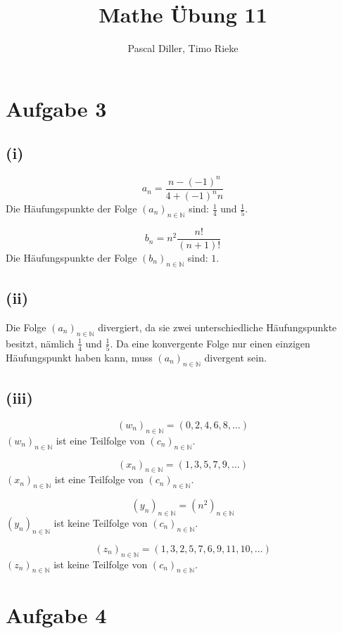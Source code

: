\documentclass{article}
\title{Mathe Übung 11}
\author{Pascal Diller, Timo Rieke}
\begin{document}
\maketitle
\section*{Aufgabe 3}

\subsection*{(i)}

    \[a_n = \frac{n - (-1)^n}{4 + (-1)^n n}\]
    Die Häufungspunkte der Folge \((a_n)_{n \in \mathbb{N}}\) sind: \(\frac{1}{4}\) und \(\frac{1}{5}\).

    \[b_n = n^2\frac{ n!}{(n+1)!}\]
    Die Häufungspunkte der Folge \((b_n)_{n \in \mathbb{N}}\) sind: \(1\).

\subsection*{(ii)}

Die Folge \((a_n)_{n \in \mathbb{N}}\) divergiert, da sie zwei unterschiedliche Häufungspunkte besitzt, nämlich \(\frac{1}{4}\) und \(\frac{1}{5}\). Da eine konvergente Folge nur einen einzigen Häufungspunkt haben kann, muss \((a_n)_{n \in \mathbb{N}}\) divergent sein.

\subsection*{(iii)}


    \[(w_n)_{n \in \mathbb{N}} = (0, 2, 4, 6, 8, \dots)\]  
    \((w_n)_{n \in \mathbb{N}}\) ist eine Teilfolge von \((c_n)_{n \in \mathbb{N}}\).

    \[(x_n)_{n \in \mathbb{N}} = (1, 3, 5, 7, 9, \dots)\]  
    \((x_n)_{n \in \mathbb{N}}\) ist eine Teilfolge von \((c_n)_{n \in \mathbb{N}}\).

    \[(y_n)_{n \in \mathbb{N}} = (n^2)_{n \in \mathbb{N}}\]  
    \((y_n)_{n \in \mathbb{N}}\) ist keine Teilfolge von \((c_n)_{n \in \mathbb{N}}\).

    \[(z_n)_{n \in \mathbb{N}} = (1, 3, 2, 5, 7, 6, 9, 11, 10, \dots)\]  
    \((z_n)_{n \in \mathbb{N}}\) ist keine Teilfolge von \((c_n)_{n \in \mathbb{N}}\).


\section*{Aufgabe 4}
\end{document}
